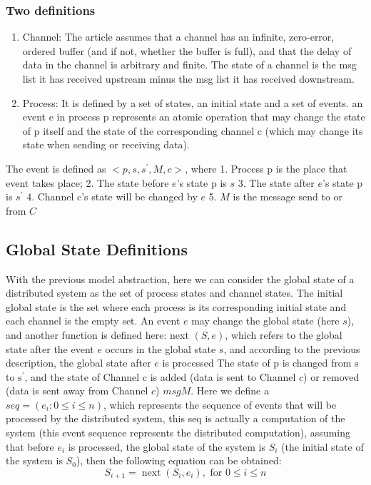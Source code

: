 \documentclass[acmlarge]{acmart}
\begin{document}
\subsubsection{Two definitions}
\begin{enumerate}
  \item Channel: The article assumes that a channel has an infinite, zero-error, ordered buffer (and if not, whether the buffer is full), and that the delay of data in the channel is arbitrary and finite. The state of a channel is the msg list it has received upstream minus the msg list it has received downstream.
  \item Process: It is defined by a set of states, an initial state and a set of events. an event e in process p represents an atomic operation that may change the state of p itself and the state of the corresponding channel c (which may change its state when sending or receiving data).
\end{enumerate}
The event is defined as $<p, s, s^{\prime}, M, c>$, where
1. Process $\mathrm{p}$ is the place that event takes place;
2. The state before $e$'s state $\mathrm{p}$ is $s$
3. The state after $e$'s state $\mathrm{p}$ is $s^{\prime}$
4. Channel c's state will be changed by $e$
5. $M$ is the message send to or from $C$

\subsection{Global State Definitions}
With the previous model abstraction, here we can consider the global state of a distributed system as the set of process states and channel states. The initial global state is the set where each process is its corresponding initial state and each channel is the empty set.
An event $e$ may change the global state (here $s$), and another function is defined here: next $(S, e)$, which refers to the global state after the event $e$ occurs in the global state $s$, and according to the previous description, the global state after $e$ is processed The state of $\mathrm{p}$ is changed from $\mathrm{s}$ to $\mathrm{s}^{\prime}$, and the state of Channel $\mathrm{c}$ is added (data is sent to Channel $c$) or removed (data is sent away from Channel $c$) $m s g M$.
Here we define a $s e q=\left(e_{i}: 0 \leq i \leq n\right)$, which represents the sequence of events that will be processed by the distributed system, this seq is actually a computation of the system (this event sequence represents the distributed computation), assuming that before $e _{i}$ is processed, the global state of the system is $S_{i}$ (the initial state of the system is $S_{0}$), then the following equation can be obtained:
$$
S_{i+1}=\operatorname{next}\left(S_{i}, e_{i}\right), \text { for } 0 \leq i \leq n
$$
\end{document}
